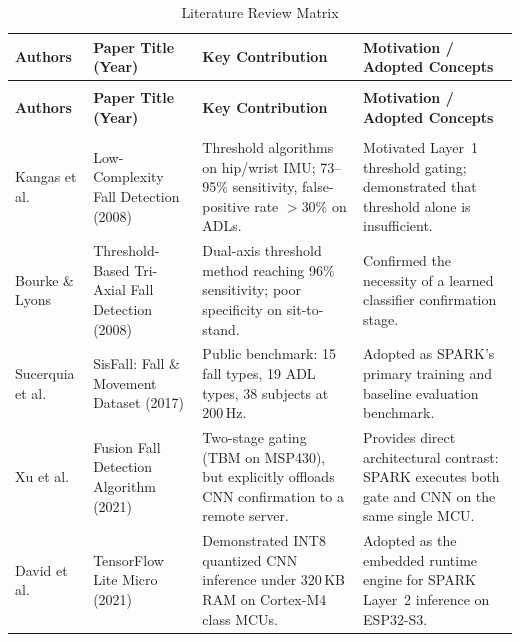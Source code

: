 \begin{longtable}{|>{\RaggedRight}p{0.8in}|>{\RaggedRight}p{1.3in}|>{\RaggedRight}p{1.7in}|>{\RaggedRight\arraybackslash}p{1.8in}|}
\caption{Literature Review Matrix} \label{tab:litreview} \\
\hline
\textbf{Authors} & \textbf{Paper Title (Year)} & \textbf{Key Contribution} & \textbf{Motivation / Adopted Concepts} \\
\hline
\endfirsthead

\multicolumn{4}{c}{\tablename\ \thetable\ -- \textit{continued from previous page}} \\
\hline
\textbf{Authors} & \textbf{Paper Title (Year)} & \textbf{Key Contribution} & \textbf{Motivation / Adopted Concepts} \\
\hline
\endhead

\hline
\multicolumn{4}{r}{\textit{continued on next page}} \\
\endfoot

\hline
\endlastfoot

Kangas et al.\ \cite{kangas2008comparison} &
Low-Complexity Fall Detection (2008) &
Threshold algorithms on hip/wrist IMU; 73--95\% sensitivity, false-positive rate $>$30\% on ADLs. &
Motivated Layer~1 threshold gating; demonstrated that threshold alone is insufficient. \\
\hline

Bourke \& Lyons \cite{bourke2008threshold} &
Threshold-Based Tri-Axial Fall Detection (2008) &
Dual-axis threshold method reaching 96\% sensitivity; poor specificity on sit-to-stand. &
Confirmed the necessity of a learned classifier confirmation stage. \\
\hline

Sucerquia et al.\ \cite{sucerquia2017sisfall} &
SisFall: Fall \& Movement Dataset (2017) &
Public benchmark: 15 fall types, 19 ADL types, 38 subjects at 200\,Hz. &
Adopted as SPARK's primary training and baseline evaluation benchmark. \\
\hline

Xu et al.\ \cite{xu2021fusion} &
Fusion Fall Detection Algorithm (2021) &
Two-stage gating (TBM on MSP430), but explicitly offloads CNN confirmation to a remote server. &
Provides direct architectural contrast: SPARK executes both gate and CNN on the same single MCU. \\
\hline

David et al.\ \cite{david2021tensorflow} &
TensorFlow Lite Micro (2021) &
Demonstrated INT8 quantized CNN inference under 320\,KB RAM on Cortex-M4 class MCUs. &
Adopted as the embedded runtime engine for SPARK Layer~2 inference on ESP32-S3. \\
\hline


\end{longtable}
